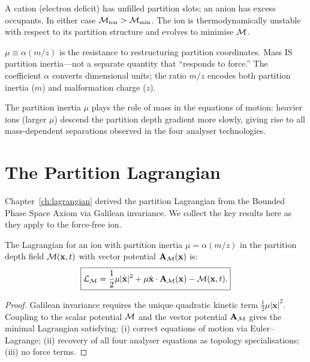 \begin{definition}
  A cation (electron deficit) has unfilled partition slots; an anion has
  excess occupants.  In either case $\mathcal{M}_{\mathrm{ion}} > \mathcal{M}_{\min}$.
  The ion is thermodynamically unstable with respect to its partition structure
  and evolves to minimise $\mathcal{M}$.
\end{definition}

\begin{definition}
  $\mu \equiv \alpha(m/z)$ is the resistance to restructuring partition
  coordinates.  Mass IS partition inertia---not a separate quantity that
  ``responds to force.''  The coefficient $\alpha$ converts dimensional units;
  the ratio $m/z$ encodes both partition inertia ($m$) and malformation charge
  ($z$).
\end{definition}

The partition inertia $\mu$ plays the role of mass in the equations of motion:
heavier ions (larger $\mu$) descend the partition depth gradient more slowly,
giving rise to all mass-dependent separations observed in the four analyser
technologies.

\section{The Partition Lagrangian}
\label{sec:ch21-lagrangian}

Chapter~\ref{ch:lagrangian} derived the partition Lagrangian from the Bounded
Phase Space Axiom via Galilean invariance.  We collect the key results here as
they apply to the force-free ion.

\begin{theorem}
\label{thm:ch21-lagrangian}
  The Lagrangian for an ion with partition inertia $\mu = \alpha(m/z)$ in
  the partition depth field $\mathcal{M}(\mathbf{x},t)$ with vector potential
  $\mathbf{A}_{\mathcal{M}}(\mathbf{x})$ is:
  \begin{equation}\label{eq:ch21-lagrangian}
    \boxed{
      \mathcal{L}_{\mathcal{M}} = \frac{1}{2}\mu|\dot{\mathbf{x}}|^2
                   + \mu\dot{\mathbf{x}}\cdot\mathbf{A}_{\mathcal{M}}(\mathbf{x})
                   - \mathcal{M}(\mathbf{x}, t).
    }
  \end{equation}
\end{theorem}

\begin{proof}
  Galilean invariance requires the unique quadratic kinetic term
  $\frac{1}{2}\mu|\dot{\mathbf{x}}|^2$.  Coupling to the scalar potential
  $\mathcal{M}$ and the vector potential $\mathbf{A}_{\mathcal{M}}$ gives the minimal Lagrangian
  satisfying: (i) correct equations of motion via Euler--Lagrange; (ii)
  recovery of all four analyser equations as topology specialisations; (iii)
  no force terms.
\end{proof}

